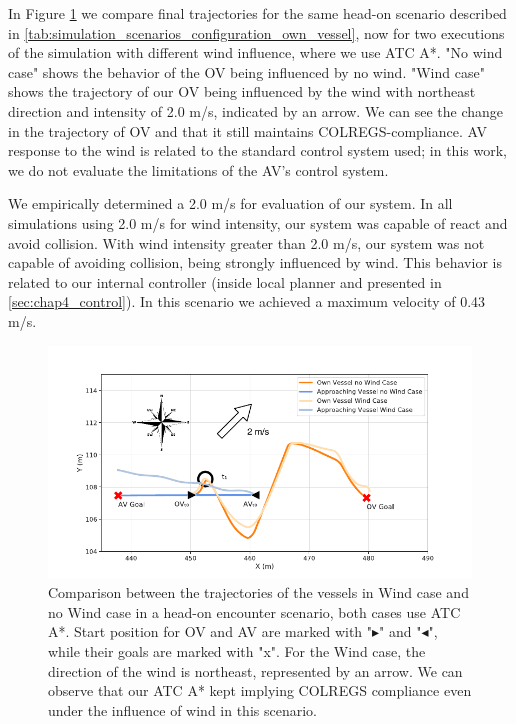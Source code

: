         In Figure \ref{fig:plot_ho_w_vs_wind} we compare final trajectories for the same head-on scenario described in \ref{tab:simulation_scenarios_configuration_own_vessel}, now for two executions of the simulation with different wind influence, where we use \ac{ATC} A*. "No wind case" shows the behavior of the \ac{OV} being influenced by no wind. "Wind case" shows the trajectory of our \ac{OV} being influenced by the wind with northeast direction and intensity of 2.0 m/s, indicated by an arrow. We can see the change in the trajectory of \ac{OV} and that it still maintains \ac{COLREGS}-compliance. \ac{AV} response to the wind is related to the standard control system used; in this work, we do not evaluate the limitations of the \ac{AV}'s control system.
        
        We empirically determined a 2.0 m/s for evaluation of our system. In all simulations using 2.0 m/s for wind intensity, our system was capable of react and avoid collision. With wind intensity greater than 2.0 m/s, our system was not capable of avoiding collision, being strongly influenced by wind. This behavior is related to our internal controller (inside local planner and presented in \ref{sec:chap4_control}). In this scenario we achieved a maximum velocity of 0.43 m/s.
        
        \begin{figure}[H]
            \centering
            \includegraphics[width=\textwidth]{figs/Chap5/plot_ho_w_vs_wind.pdf}
            \caption{Comparison between the trajectories of the vessels in Wind case and no Wind case in a head-on encounter scenario, both cases use \ac{ATC} A*. Start position for \ac{OV} and \ac{AV} are marked with "$\blacktriangleright$" and "$\blacktriangleleft$", while their goals are marked with "x". For the Wind case, the direction of the wind is northeast, represented by an arrow. We can observe that our \ac{ATC} A* kept implying COLREGS compliance even under the influence of wind in this scenario.}
            \label{fig:plot_ho_w_vs_wind}
        \end{figure}
        
